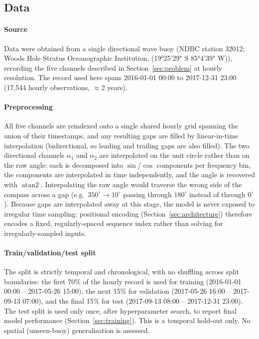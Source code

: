 \subsection{Data}
\label{sec:data}

\paragraph{Source}
Data were obtained from a single directional wave buoy (NDBC station 32012; Woods Hole Stratus Oceanographic Institution, (19°25'29" S 85°4'39" W)), recording the five channels described in Section~\ref{sec:problem} at hourly resolution. The record used here spans 2016-01-01 00:00 to 2017-12-31 23:00 (17,544 hourly observations, $\approx$2 years).

\paragraph{Preprocessing}
All five channels are reindexed onto a single shared hourly grid spanning the union of their timestamps, and any resulting gaps are filled by linear-in-time interpolation (bidirectional, so leading and trailing gaps are also filled). The two directional channels $\alpha_1$ and $\alpha_2$ are interpolated on the unit circle rather than on the raw angle: each is decomposed into $\sin$/$\cos$ components per frequency bin, the components are interpolated in time independently, and the angle is recovered with $\operatorname{atan2}$. Interpolating the raw angle would traverse the wrong side of the compass across a gap (e.g.\ $350^\circ \to 10^\circ$ passing through $180^\circ$ instead of through $0^\circ$). Because gaps are interpolated away at this stage, the model is never exposed to irregular time sampling: positional encoding (Section~\ref{sec:architecture}) therefore encodes a fixed, regularly-spaced sequence index rather than solving for irregularly-sampled inputs.

\paragraph{Train/validation/test split}
The split is strictly temporal and chronological, with no shuffling across split boundaries: the first 70\% of the hourly record is used for training (2016-01-01 00:00 -- 2017-05-26 15:00), the next 15\% for
validation (2017-05-26 16:00 -- 2017-09-13 07:00), and the final 15\% for test (2017-09-13 08:00 -- 2017-12-31 23:00). The test split is used only once, after hyperparameter search, to report final model performance (Section~\ref{sec:training}). This is a temporal hold-out only. No spatial (unseen-buoy) generalisation is assessed.

